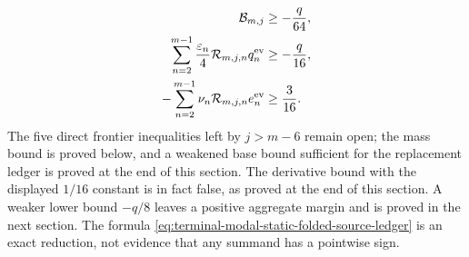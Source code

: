 \begin{lemma}
\begin{align}
 \mathcal B_{m,j}&\ge-\frac q{64},
 \label{eq:terminal-modal-static-base-kernel-target}\\
 \sum_{n=2}^{m-1}\frac{\varepsilon_n}{4}
  \mathcal R_{m,j,n}q_n^{\rm ev}&\ge-\frac q{16},
 \label{eq:terminal-modal-static-derivative-kernel-target}\\
 -\sum_{n=2}^{m-1}\nu_n
  \mathcal R_{m,j,n}e_n^{\rm ev}&\ge\frac3{16}.
 \label{eq:terminal-modal-static-mass-kernel-target}
\end{align}
The five direct frontier inequalities left by $j>m-6$ remain open; the mass
bound is proved below, and a weakened base bound sufficient for the replacement
ledger is proved at the end of this section.  The derivative bound with the
displayed $1/16$ constant is in fact false, as proved at the end of this
section.  A weaker lower bound $-q/8$ leaves a positive aggregate margin and is
proved in the next section.  The formula
\eqref{eq:terminal-modal-static-folded-source-ledger} is an exact reduction,
not evidence that any summand has a pointwise sign.
\end{lemma}

